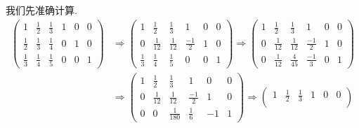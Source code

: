 ﻿\documentclass{book} \usepackage{exsheets} \usepackage{xeCJK}
\begin{document}
\begin{solution}
  我们先准确计算.
  \begin{align*}
    \begin{pmatrix}
      1&\frac{1}{2}&\frac{1}{3}&1&0&0\\
      \frac{1}{2}&\frac{1}{3}&\frac{1}{4}&0&1&0\\
      \frac{1}{3}&\frac{1}{4}&\frac{1}{5}&0&0&1
    \end{pmatrix}&\Rightarrow
                   \begin{pmatrix}
                     1&\frac{1}{2}&\frac{1}{3}&1&0&0\\
                     0&\frac{1}{12}&\frac{1}{12}&\frac{-1}{2}&1&0\\
                     \frac{1}{3}&\frac{1}{4}&\frac{1}{5}&0&0&1
                   \end{pmatrix}\Rightarrow
                                                              \begin{pmatrix}
                                                                1&\frac{1}{2}&\frac{1}{3}&1&0&0\\
                                                                0&\frac{1}{12}&\frac{1}{12}&\frac{-1}{2}&1&0\\
                                                                0&\frac{1}{12}&\frac{4}{45}&\frac{-1}{3}&0&1
                                                              \end{pmatrix}\\&\Rightarrow
                                                                               \begin{pmatrix}
                                                                                 1&\frac{1}{2}&\frac{1}{3}&1&0&0\\
                                                                                 0&\frac{1}{12}&\frac{1}{12}&\frac{-1}{2}&1&0\\
                                                                                 0&0&\frac{1}{180}&\frac{1}{6}&-1&1
                                                                               \end{pmatrix}\Rightarrow
                                                                                                                   \begin{pmatrix}
                                                                                                                     1&\frac{1}{2}&\frac{1}{3}&1&0&0\\

\end{pmatrix}
\end{align*}
\end{solution}
\end{document}
